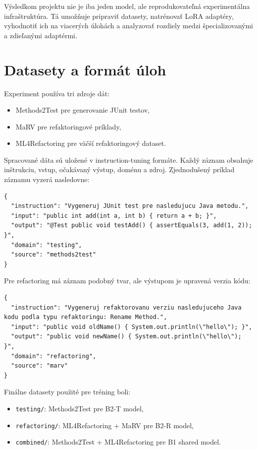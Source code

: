 \documentclass[11pt,a4paper]{article}
\begin{document}
Výsledkom projektu nie je iba jeden model, ale reprodukovateľná experimentálna infraštruktúra. Tá umožňuje pripraviť datasety, natrénovať LoRA adaptéry, vyhodnotiť ich na viacerých úlohách a analyzovať rozdiely medzi špecializovanými a zdieľanými adaptérmi.

\section{Datasety a formát úloh}

Experiment používa tri zdroje dát:
\begin{itemize}
\item Methods2Test pre generovanie JUnit testov,
\item MaRV pre refaktoringové príklady,
\item ML4Refactoring pre väčší refaktoringový dataset.
\end{itemize}

Spracované dáta sú uložené v instruction-tuning formáte. Každý záznam obsahuje inštrukciu, vstup, očakávaný výstup, doménu a zdroj. Zjednodušený príklad záznamu vyzerá nasledovne:

\begin{lstlisting}
{
  "instruction": "Vygeneruj JUnit test pre nasledujucu Java metodu.",
  "input": "public int add(int a, int b) { return a + b; }",
  "output": "@Test public void testAdd() { assertEquals(3, add(1, 2)); }",
  "domain": "testing",
  "source": "methods2test"
}
\end{lstlisting}

Pre refactoring má záznam podobný tvar, ale výstupom je upravená verzia kódu:

\begin{lstlisting}
{
  "instruction": "Vygeneruj refaktorovanu verziu nasledujuceho Java kodu podla typu refaktoringu: Rename Method.",
  "input": "public void oldName() { System.out.println(\"hello\"); }",
  "output": "public void newName() { System.out.println(\"hello\"); }",
  "domain": "refactoring",
  "source": "marv"
}
\end{lstlisting}

Finálne datasety použité pre tréning boli:
\begin{itemize}
\item \texttt{testing/}: Methods2Test pre B2-T model,
\item \texttt{refactoring/}: ML4Refactoring + MaRV pre B2-R model,
\item \texttt{combined/}: Methods2Test + ML4Refactoring pre B1 shared model.
\end{itemize}
\end{document}
